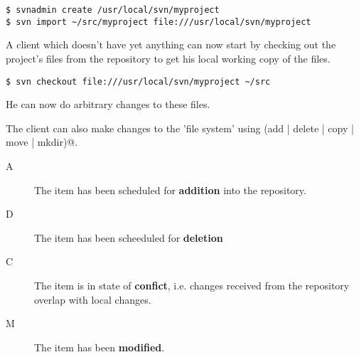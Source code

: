 \documentclass[a4paper]{report}
\begin{document}
\begin{verbatim}
$ svnadmin create /usr/local/svn/myproject
$ svn import ~/src/myproject file:///usr/local/svn/myproject
\end{verbatim}

A client which doesn't have yet anything can now start by checking out
the project's files from the repository to get his local working copy of
the files.

\begin{verbatim}
$ svn checkout file:///usr/local/svn/myproject ~/src
\end{verbatim}

He can now do arbitrary changes to these files. 

The client can also make changes to the 'file system' using 
\verb@svn (add | delete | copy | move | mkdir)@. 


\begin{description}
 \item[A] The item has been scheduled for \textbf{addition} into the
            repository.
 \item[D] The item has been scheeduled for \textbf{deletion}
 \item[C] The item is in state of \textbf{confict}, i.e. changes received
            from the repository overlap with local changes.
 \item[M] The item has been \textbf{modified}.
\end{description}
\end{document}
